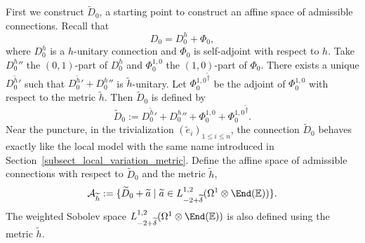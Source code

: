 First we construct $\widetilde{D}_0$, a starting point to construct an affine space of admissible connections. Recall that
\[
D_0 = D_0^h +\Phi_0,
\]
where $D_0^h$ is a $h$-unitary connection and $\Phi_0$ is self-adjoint with respect to $h$. Take ${D^h_0}{}''$ the $(0,1)$-part of $D_0^h$ and $\Phi_0^{1,0}$ the $(1,0)$-part of $\Phi_0$. There exists a unique ${D^{\widetilde{h}}_0}{}'$ such that ${D^{\widetilde{h}}_0}{}'+{D^h_0}{}''$ is $\widetilde{h}$-unitary. Let ${\Phi_0^{1,0}}^{\widetilde{\dagger}}$ be the adjoint of $\Phi_0^{1,0}$ with respect to the metric $\widetilde{h}$. Then $\widetilde{D}_0$ is defined by
\[
\widetilde{D}_0 := {D^{\widetilde{h}}_0}{}'+{D^h_0}{}''+ \Phi_0^{1,0} + {\Phi_0^{1,0}}^{\widetilde{\dagger}}.
\]
Near the puncture, in the trivialization $(\widetilde{e}_i)_{1\le i \le n}$, the connection $\widetilde{D}_0$ behaves exactly like the local model with the same name introduced in Section~\ref{subsect_local_variation_metric}. Define the affine space of admissible connections with respect to $\widetilde{D}_0$ and the metric $\widetilde{h}$,
\[
\mathcal{A}_{\widetilde{h}}:=\lbrace \widetilde{D}_0 + \widetilde{a} \mid \widetilde{a} \in L^{1,2}_{-2+\widetilde{\delta}}(\Omega^1 \otimes \End(\mathbb{E}))\rbrace.
\]
The weighted Sobolev space $L^{1,2}_{-2+\widetilde{\delta}}(\Omega^1\otimes \End(\mathbb{E}))$ is also defined using the metric $\widetilde{h}$.


